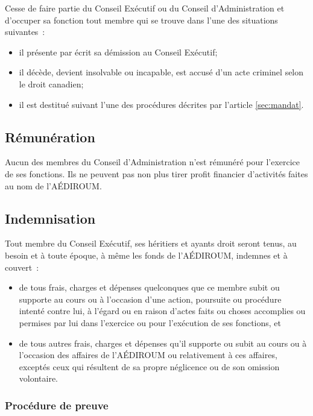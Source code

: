 \documentclass{aediroum}
\newcommand{\article}[1]{article \ref{#1}}
\begin{document}
Cesse de faire partie du Conseil Exécutif ou du Conseil d'Administration et d'occuper sa fonction tout membre qui se trouve dans l'une des situations suivantes~:
  \begin{itemize}
  \item il présente par écrit sa démission au Conseil Exécutif;
  \item il décède, devient insolvable ou incapable, est accusé d'un acte criminel selon le droit canadien;
  \item il est destitué suivant l'une des procédures décrites par l'\article{sec:mandat}.
  \end{itemize}

\subsection{Rémunération}\label{sec:renumeration}

Aucun des membres du Conseil d'Administration n'est rémunéré pour l'exercice de ses fonctions. Ils ne peuvent pas non plus tirer profit financier d'activités faites au nom de l'AÉDIROUM.

\subsection{Indemnisation}\label{sec:indemnisation}

Tout membre du Conseil Exécutif, ses héritiers et ayants droit seront tenus, au besoin et à toute époque, à même les fonds de l'AÉDIROUM, indemnes et à couvert~:
\begin{itemize}
\item de tous frais, charges et dépenses quelconques que ce membre subit ou supporte au cours ou à l'occasion d'une action, poursuite ou procédure intenté contre lui, à l'égard ou en raison d'actes faits ou choses accomplies ou permises par lui dans l'exercice ou pour l'exécution de ses fonctions, et
\item de tous autres frais, charges et dépenses qu'il supporte ou subit au cours ou à l'occasion des affaires de l'AÉDIROUM ou relativement à ces affaires, exceptés ceux qui résultent de sa propre néglicence ou de son omission volontaire.
\end{itemize}

\subsubsection{Procédure de preuve}\label{sec:procedure-de-preuve}
\end{document}
